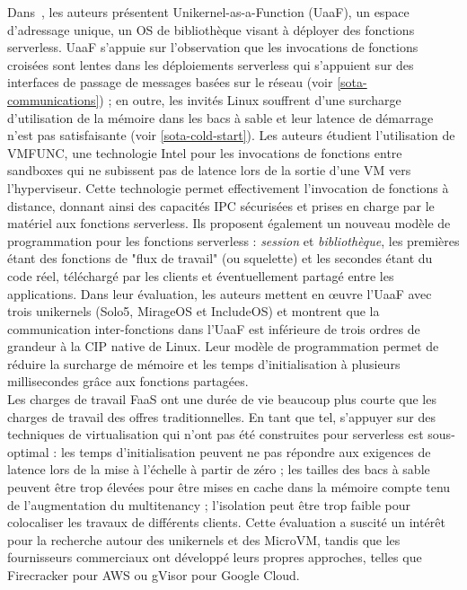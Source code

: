 Dans~\cite{tanLightweightServerlessComputing2020}, les auteurs présentent Unikernel-as-a-Function (UaaF), un espace d'adressage unique, un OS de bibliothèque visant à déployer des fonctions serverless. UaaF s'appuie sur l'observation que les invocations de fonctions croisées sont lentes dans les déploiements serverless qui s'appuient sur des interfaces de passage de messages basées sur le réseau (voir \ref{sota-communications}) ; en outre, les invités Linux souffrent d'une surcharge d'utilisation de la mémoire dans les bacs à sable et leur latence de démarrage n'est pas satisfaisante (voir \ref{sota-cold-start}). Les auteurs étudient l'utilisation de VMFUNC, une technologie Intel pour les invocations de fonctions entre sandboxes qui ne subissent pas de latence lors de la sortie d'une VM vers l'hyperviseur. Cette technologie permet effectivement l'invocation de fonctions à distance, donnant ainsi des capacités IPC sécurisées et prises en charge par le matériel aux fonctions serverless. Ils proposent également un nouveau modèle de programmation pour les fonctions serverless : \textit{session} et \textit{bibliothèque}, les premières étant des fonctions de "flux de travail" (ou squelette) et les secondes étant du code réel, téléchargé par les clients et éventuellement partagé entre les applications. Dans leur évaluation, les auteurs mettent en œuvre l'UaaF avec trois unikernels (Solo5, MirageOS et IncludeOS) et montrent que la communication inter-fonctions dans l'UaaF est inférieure de trois ordres de grandeur à la CIP native de Linux. Leur modèle de programmation permet de réduire la surcharge de mémoire et les temps d'initialisation à plusieurs millisecondes grâce aux fonctions partagées.
\\

Les charges de travail FaaS ont une durée de vie beaucoup plus courte que les charges de travail des offres traditionnelles. En tant que tel, s'appuyer sur des techniques de virtualisation qui n'ont pas été construites pour serverless est sous-optimal : les temps d'initialisation peuvent ne pas répondre aux exigences de latence lors de la mise à l'échelle à partir de zéro ; les tailles des bacs à sable peuvent être trop élevées pour être mises en cache dans la mémoire compte tenu de l'augmentation du multitenancy ; l'isolation peut être trop faible pour colocaliser les travaux de différents clients. Cette évaluation a suscité un intérêt pour la recherche autour des unikernels et des MicroVM, tandis que les fournisseurs commerciaux ont développé leurs propres approches, telles que Firecracker pour AWS ou gVisor pour Google Cloud.

